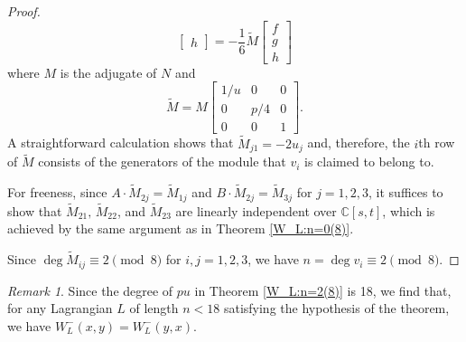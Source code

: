 \documentclass[a4paper,reqno]{amsart}
\theoremstyle{definition}
\theoremstyle{remark} \newtheorem{remark}[theorem]{Remark}
\numberwithin{equation}{section}
\begin{document}
\begin{proof}
\begin{equation*}
\begin{bmatrix}
            h
        \end{bmatrix} =
        -\frac{1}{6} \tilde{M}
        \begin{bmatrix}
            f \\
            g \\
            h
        \end{bmatrix}
    \end{equation*}
    where \(M\) is the adjugate of \(N\) and
    \begin{equation*}
        \tilde{M} = M
        \begin{bmatrix}
            1/u & 0 & 0 \\
            0 & p/4 & 0 \\
            0 & 0 & 1
        \end{bmatrix}.
    \end{equation*}
    A straightforward calculation shows that \(\tilde{M}_{j1} = -2u_j\) and, therefore, the \(i\)th row of \(\tilde{M}\) consists of the generators of the module that \(v_i\) is claimed to belong to. 
    
    For freeness, since \(A\cdot \tilde{M}_{2j} = \tilde{M}_{1j}\) and \(B \cdot \tilde{M}_{2j} = \tilde{M}_{3j}\) for \(j = 1,2,3\), it suffices to show that \(\tilde{M}_{21},\, \tilde{M}_{22}\), and \(\tilde{M}_{23}\) are linearly independent over \(\mathbb{C}[s,t]\), which is achieved by the same argument as in Theorem \ref{W_L:n=0(8)}.

    Since \(\deg \tilde{M}_{ij} \equiv 2 \pmod{8}\) for \(i,j = 1,2,3\), we have \(n = \deg v_i \equiv 2 \pmod{8}\).
\end{proof}

\begin{remark}
    Since the degree of \(pu\) in Theorem \ref{W_L:n=2(8)} is 18, we find that, for any Lagrangian \(L\) of length \(n < 18\) satisfying the hypothesis of the theorem, we have \(W_L^-(x,y) = W_L^-(y,x)\). 
\end{remark}
\end{document}
